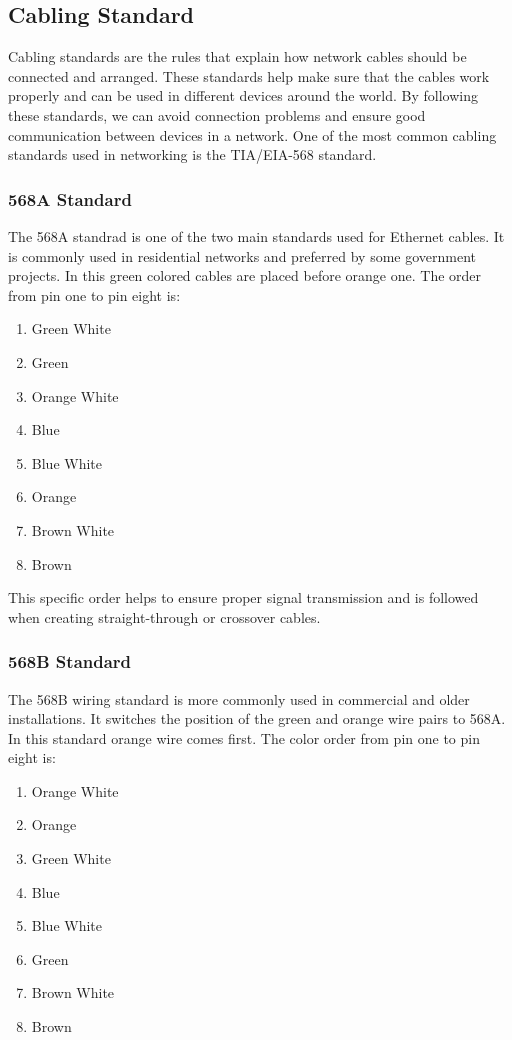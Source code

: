 \documentclass[a4paper,12pt]{report}
\begin{document}
\subsection*{Cabling Standard}
Cabling standards are the rules that explain how network cables should be connected and arranged. These standards help make sure that the cables work properly and can be used in different devices around the world. By following these standards, we can avoid connection problems and ensure good communication between devices in a network. One of the most common cabling standards used in networking is the TIA/EIA-568 standard.
\subsubsection*{568A Standard}
The 568A standrad is one of the two main standards used for Ethernet cables. It is commonly used in residential networks and preferred by some government projects. In this green colored cables are placed before orange one. The order from pin one to pin eight is:


\begin{enumerate}
    \item Green White
    \item Green
    \item Orange White
    \item Blue
    \item Blue White
    \item Orange
    \item Brown White
    \item Brown
\end{enumerate}

This specific order helps to ensure proper signal transmission and is followed when creating straight-through or crossover cables.

\subsubsection*{568B Standard}
The 568B wiring standard is more commonly used in commercial and older installations. It switches the position of the green and orange wire pairs to 568A. In this standard orange wire comes first. The color order from pin one to pin eight is:

\begin{enumerate}
    \item Orange White
    \item Orange
    \item Green White
    \item Blue
    \item Blue White
    \item Green
    \item Brown White
    \item Brown
\end{enumerate}
\end{document}
